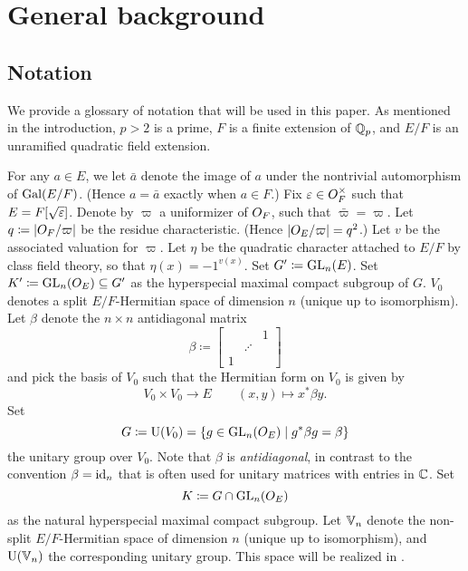 \chapter{General background}
\label{ch:background}

\section{Notation}
We provide a glossary of notation that will be used in this paper.
As mentioned in the introduction, $p > 2$ is a prime,
$F$ is a finite extension of $\mathbb Q_p$,
and $E/F$ is an unramified quadratic field extension.

\begin{itemize}
  \ii For any $a \in E$, we let $\bar a$ denote the image of $a$
  under the nontrivial automorphism of $\operatorname{Gal}(E/F)$.
  (Hence $a = \bar a$ exactly when $a \in F$.)
  \ii Fix $\varepsilon \in O_F^\times$ such that $E = F[\sqrt{\varepsilon}]$.
  \ii Denote by $\varpi$ a uniformizer of $O_F$, such that $\bar \varpi = \varpi$.
  \ii Let $q \coloneqq |O_F/\varpi|$ be the residue characteristic.
  (Hence $|O_E / \varpi| = q^2$.)
  \ii Let $v$ be the associated valuation for $\varpi$.
  \ii Let $\eta$ be the quadratic character attached to $E/F$ by class field theory,
  so that $\eta(x) = -1^{v(x)}$.
  \ii Set $G' \coloneqq \operatorname{GL}_n(E)$.
  \ii Set $K' \coloneqq \operatorname{GL}_n(O_E) \subseteq G'$ as the hyperspecial maximal compact subgroup of $G$.
  \ii $V_0$ denotes a split $E/F$-Hermitian space of dimension $n$ (unique up to isomorphism).
  \ii Let $\beta$ denote the $n \times n$ antidiagonal matrix
  \[ \beta \coloneqq \begin{bmatrix} && 1 \\ & \iddots \\ 1 \end{bmatrix} \]
  and pick the basis of $V_0$ such that the Hermitian form on $V_0$ is given by
  \[ V_0 \times V_0 \to E \qquad (x,y) \mapsto x^\ast \beta y. \]
  \ii Set
  \[ G \coloneqq \operatorname{U}(V_0) = \{ g \in \operatorname{GL}_n(O_E) \mid g^\ast \beta g = \beta\} \]
  the unitary group over $V_0$.
  Note that $\beta$ is \emph{antidiagonal}, in contrast to the convention $\beta = \operatorname{id}_n$
  that is often used for unitary matrices with entries in $\mathbb C$.
  \ii Set
  \[ K \coloneqq G \cap \operatorname{GL}_n(O_E) \]
  as the natural hyperspecial maximal compact subgroup.
  \ii Let $\mathbb V_n$ denote the non-split $E/F$-Hermitian space of dimension $n$
  (unique up to isomorphism), and $\operatorname{U}(\mathbb V_n)$ the corresponding unitary group.
  This space will be realized in .
\end{itemize}

